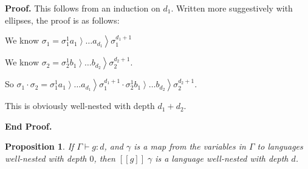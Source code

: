 \documentclass{article}
\newcommand{\rgt}[1]{\left.{#1}\right>}
\newcommand{\judgebalance}[3][\Gamma]{{#1} \vdash {#2} : {#3}}
\newcommand{\interp}[1]{[\![{#1}]\!]}
\newtheorem{prop}{Proposition}
\newenvironment{proof}{\noindent\textbf{Proof.}}
{\noindent\textbf{End Proof.}}
\begin{document}
\begin{proof}
  This follows from an induction on $d_1$. Written more suggestively with ellipses, 
the proof is as follows: 

  We know $\sigma_1 = \sigma^1_1\rgt{a_1}\ldots\rgt{a_{d_1}}\sigma^{d_1+1}_1$

  We know $\sigma_2 = \sigma^1_2\rgt{b_1}\ldots\rgt{b_{d_2}}\sigma^{d_2+1}_2$.
  
  So $\sigma_1\cdot\sigma_2 = \sigma^1_1\rgt{a_1}\ldots\rgt{a_{d_1}}\sigma^{d_1+1}_1\cdot\sigma^1_2\rgt{b_1}\ldots\rgt{b_{d_2}}\sigma^{d_2+1}_2$.

  This is obviously well-nested with depth $d_1 + d_2$. 

\end{proof}

\begin{prop}
If $\judgebalance{g}{d}$, and $\gamma$ is a map from the variables in $\Gamma$ to 
languages well-nested with depth $0$, then $\interp{g}\;\gamma$ is a language well-nested 
with depth $d$. 
\end{prop}
\end{document}
